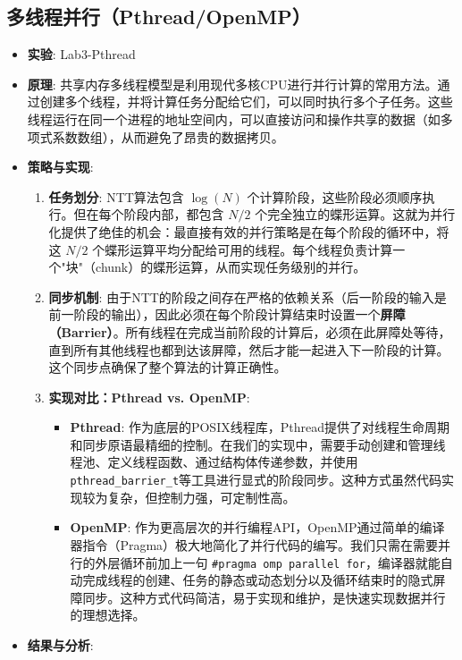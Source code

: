 \documentclass[a4paper]{article}
\begin{document}
\subsection{多线程并行（Pthread/OpenMP）}
\begin{itemize}
    \item \textbf{实验}: Lab3-Pthread
    \item \textbf{原理}: 共享内存多线程模型是利用现代多核CPU进行并行计算的常用方法。通过创建多个线程，并将计算任务分配给它们，可以同时执行多个子任务。这些线程运行在同一个进程的地址空间内，可以直接访问和操作共享的数据（如多项式系数数组），从而避免了昂贵的数据拷贝。
    \item \textbf{策略与实现}:
    \begin{enumerate}
        \item \textbf{任务划分}: NTT算法包含 $\log(N)$ 个计算阶段，这些阶段必须顺序执行。但在每个阶段内部，都包含 $N/2$ 个完全独立的蝶形运算。这就为并行化提供了绝佳的机会：最直接有效的并行策略是在每个阶段的循环中，将这 $N/2$ 个蝶形运算平均分配给可用的线程。每个线程负责计算一个"块"（chunk）的蝶形运算，从而实现任务级别的并行。
        \item \textbf{同步机制}: 由于NTT的阶段之间存在严格的依赖关系（后一阶段的输入是前一阶段的输出），因此必须在每个阶段计算结束时设置一个\textbf{屏障（Barrier）}。所有线程在完成当前阶段的计算后，必须在此屏障处等待，直到所有其他线程也都到达该屏障，然后才能一起进入下一阶段的计算。这个同步点确保了整个算法的计算正确性。
        \item \textbf{实现对比：Pthread vs. OpenMP}:
        \begin{itemize}
            \item \textbf{Pthread}: 作为底层的POSIX线程库，Pthread提供了对线程生命周期和同步原语最精细的控制。在我们的实现中，需要手动创建和管理线程池、定义线程函数、通过结构体传递参数，并使用\texttt{pthread\_barrier\_t}等工具进行显式的阶段同步。这种方式虽然代码实现较为复杂，但控制力强，可定制性高。
            \item \textbf{OpenMP}: 作为更高层次的并行编程API，OpenMP通过简单的编译器指令（Pragma）极大地简化了并行代码的编写。我们只需在需要并行的外层循环前加上一句 \texttt{\#pragma omp parallel for}，编译器就能自动完成线程的创建、任务的静态或动态划分以及循环结束时的隐式屏障同步。这种方式代码简洁，易于实现和维护，是快速实现数据并行的理想选择。
        \end{itemize}
    \end{enumerate}
    \item \textbf{结果与分析}:
    \begin{itemize}

\end{itemize}
\end{itemize}
\end{document}
